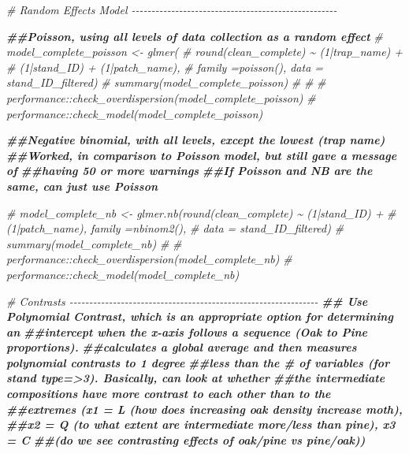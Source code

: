 \documentclass[
]{article}
\newenvironment{Shaded}{\begin{snugshade}}{\end{snugshade}}
\newcommand{\CommentTok}[1]{\textcolor[rgb]{0.56,0.35,0.01}{\textit{#1}}}
\newcommand{\DocumentationTok}[1]{\textcolor[rgb]{0.56,0.35,0.01}{\textbf{\textit{#1}}}}
\begin{document}
\begin{Shaded}
\begin{Highlighting}[]
\CommentTok{\# Random Effects Model {-}{-}{-}{-}{-}{-}{-}{-}{-}{-}{-}{-}{-}{-}{-}{-}{-}{-}{-}{-}{-}{-}{-}{-}{-}{-}{-}{-}{-}{-}{-}{-}{-}{-}{-}{-}{-}{-}{-}{-}{-}{-}{-}{-}{-}{-}{-}{-}{-}{-}{-}{-}}

\DocumentationTok{\#\#Poisson, using all levels of data collection as a random effect }
\CommentTok{\# model\_complete\_poisson \textless{}{-} glmer(}
\CommentTok{\#   round(clean\_complete) \textasciitilde{} (1|trap\_name) + }
\CommentTok{\#     (1|stand\_ID) + (1|patch\_name), }
\CommentTok{\#   family =poisson(), data = stand\_ID\_filtered)}
\CommentTok{\# summary(model\_complete\_poisson)}
\CommentTok{\# }
\CommentTok{\# }
\CommentTok{\# performance::check\_overdispersion(model\_complete\_poisson)}
\CommentTok{\# performance::check\_model(model\_complete\_poisson)}


\DocumentationTok{\#\#Negative binomial, with all levels, except the lowest (trap name)}
\DocumentationTok{\#\#Worked, in comparison to Poisson model, but still gave a message of }
\DocumentationTok{\#\#having 50 or more warnings}
\DocumentationTok{\#\#If Poisson and NB are the same, can just use Poisson}

\CommentTok{\# model\_complete\_nb \textless{}{-} glmer.nb(round(clean\_complete) \textasciitilde{} (1|stand\_ID)  + }
\CommentTok{\#                              (1|patch\_name), family =nbinom2(), }
\CommentTok{\#                      data = stand\_ID\_filtered)}
\CommentTok{\# summary(model\_complete\_nb)}
\CommentTok{\# }
\CommentTok{\# performance::check\_overdispersion(model\_complete\_nb)}
\CommentTok{\# performance::check\_model(model\_complete\_nb)}


\CommentTok{\# Contrasts {-}{-}{-}{-}{-}{-}{-}{-}{-}{-}{-}{-}{-}{-}{-}{-}{-}{-}{-}{-}{-}{-}{-}{-}{-}{-}{-}{-}{-}{-}{-}{-}{-}{-}{-}{-}{-}{-}{-}{-}{-}{-}{-}{-}{-}{-}{-}{-}{-}{-}{-}{-}{-}{-}{-}{-}{-}{-}{-}{-}{-}{-}{-}}
\DocumentationTok{\#\# Use Polynomial Contrast, which is an appropriate option for determining an}
\DocumentationTok{\#\#intercept when the x{-}axis follows a sequence (Oak to Pine proportions).}
\DocumentationTok{\#\#calculates a global average and then measures polynomial contrasts to 1 degree}
\DocumentationTok{\#\#less than the \# of variables (for stand type=\textgreater{}3). Basically, can look at whether}
\DocumentationTok{\#\#the intermediate compositions have more contrast to each other than to the}
\DocumentationTok{\#\#extremes (x1 = L (how does increasing oak density increase moth), }
\DocumentationTok{\#\#x2 = Q (to what extent are intermediate more/less than pine), x3 = C }
\DocumentationTok{\#\#(do we see contrasting effects of oak/pine vs pine/oak))}



\end{Highlighting}
\end{Shaded}
\end{document}
